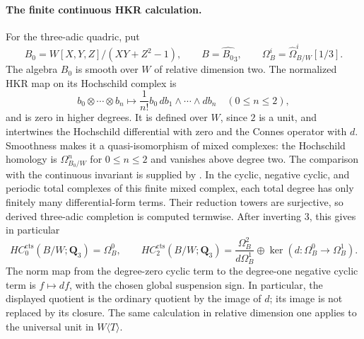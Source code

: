 \documentclass[11pt,a4paper]{article}
\theoremstyle{remark}
\begin{document}
\paragraph{The finite continuous HKR calculation.}
For the three-adic quadric, put
\[
 B_0=W[X,Y,Z]/(XY+Z^2-1),\qquad B=\widehat{B_0}_3,
 \qquad \Omega_B^i=\widehat\Omega^i_{B/W}[1/3].
\]
The algebra $B_0$ is smooth over $W$ of relative dimension two.
The normalized HKR map on its Hochschild complex is
\[
 b_0\otimes\cdots\otimes b_n\longmapsto
 \frac{1}{n!}b_0\,db_1\wedge\cdots\wedge db_n
 \quad(0\le n\le2),
\]
and is zero in higher degrees.  It is defined over $W$, since $2$ is
a unit, and intertwines the Hochschild differential with zero and the
Connes operator with $d$.  Smoothness makes it a quasi-isomorphism of
mixed complexes: the Hochschild homology is $\Omega^n_{B_0/W}$ for
$0\le n\le2$ and vanishes above degree two.
The comparison with the continuous invariant is supplied by
\cite[Proposition~4.2]{AMMN}.  In the cyclic, negative cyclic, and
periodic total complexes of this finite mixed complex, each total
degree has only finitely many differential-form terms.  Their
reduction towers are surjective, so derived three-adic completion is
computed termwise.  After inverting $3$, this gives in particular
\[
 HC^{\mathrm{cts}}_0(B/W;\mathbf Q_3)=\Omega_B^0,
 \qquad
 HC^{\mathrm{cts}}_2(B/W;\mathbf Q_3)
   =\frac{\Omega_B^2}{d\Omega_B^1}
     \oplus\ker(d:\Omega_B^0\to\Omega_B^1).
\]
The norm map from the degree-zero cyclic term to the degree-one
negative cyclic term is $f\mapsto df$, with the chosen global
suspension sign.  In particular, the displayed quotient is the
ordinary quotient by the image of $d$; its image is not replaced by
its closure.  The same calculation in relative dimension one applies
to the universal unit in $W\langle T\rangle$.
\end{document}
